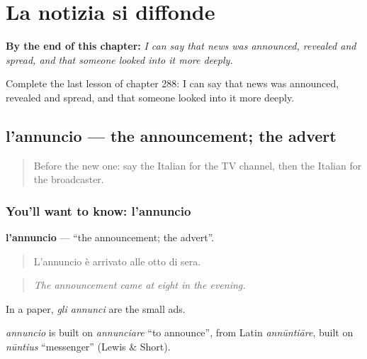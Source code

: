 
\chapter{La notizia si diffonde}
\label{ch:it-la-notizia-si-diffonde}

\begin{chapteropening}
\textbf{By the end of this chapter:} \emph{I can say that news was announced, revealed and spread, and that someone looked into it more deeply.}

Complete the last lesson of chapter 288: I can say that news was announced, revealed and spread, and that someone looked into it more deeply.
\end{chapteropening}

\section[l'annuncio]{l'annuncio — the announcement; the advert}

\label{lesson:IT-C288-annuncio}



\begin{quote}
Before the new one: say the Italian for the TV channel, then the Italian for the broadcaster.
\end{quote}

\subsection*{You'll want to know: l'annuncio}
\textbf{l'annuncio} — \textquotedblleft{}the announcement; the advert\textquotedblright{}.

\begin{quote}
L'annuncio è arrivato alle otto di sera.
\end{quote}

\begin{quote}
\emph{The announcement came at eight in the evening.}
\end{quote}

In a paper, \emph{gli annunci} are the small ads.

\begin{cousinweb}
\emph{annuncio} is built on \emph{annunciare} \textquotedblleft{}to announce\textquotedblright{}, from Latin \emph{annūntiāre}, built on \emph{nūntius} \textquotedblleft{}messenger\textquotedblright{} (Lewis \& Short).
\end{cousinweb}

